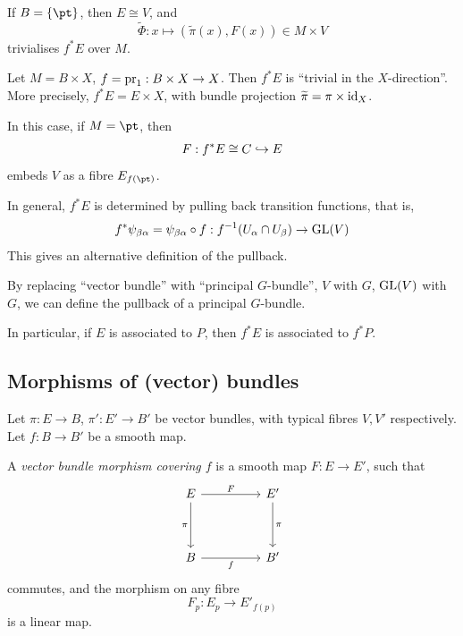 \documentclass{article}
\begin{document}
\begin{example}
    If \(B = \{\pt\}\), then \(E \cong V\), and
    \[\widetilde\Phi : x \mapsto (\tilde\pi(x), F(x)) \in M \times V\]
    trivialises \(f^*E\) over \(M\). 
\end{example}

\begin{example}
    Let \(M = B \times X\), \(f = \operatorname{pr}_1 : B \times X \to X\). Then \(f^*E\) is ``trivial in the \(X\)-direction''. More precisely, \(f^*E =  E \times X\), with bundle projection \(\widetilde\pi = \pi \times \operatorname{id}_X\).
\end{example}

\begin{example}
    In this case, if \(M = \pt\), then
    \[F : f^*E \cong C \hookrightarrow E\]
    embeds \(V\) as a fibre \(E_{f(\pt)}\).
\end{example}

In general, \(f^*E\) is determined by pulling back transition functions, that is,
\[f^*\psi_{\beta\alpha} = \psi_{\beta\alpha}\circ f : f^{-1}(U_\alpha \cap U_\beta) \to \operatorname{GL}(V)\]
This gives an alternative definition of the pullback.

By replacing ``vector bundle'' with ``principal \(G\)-bundle'', \(V\) with \(G\), \(\operatorname{GL}(V)\) with \(G\), we can define the pullback of a principal \(G\)-bundle.

In particular, if \(E\) is associated to \(P\), then \(f^*E\) is associated to \(f^*P\).

\lec

\subsection{Morphisms of (vector) bundles}

Let \(\pi : E \to B\), \(\pi' : E' \to B'\) be vector bundles, with typical fibres \(V, V'\) respectively. Let \(f : B \to B'\) be a smooth map.

\begin{definition}
     A \emph{vector bundle morphism covering \(f\)} is a smooth map \(F : E \to E'\), such that
\[\begin{tikzcd}
	E && {E'} \\
	\\
	B && {B'}
	\arrow["\pi"', from=1-1, to=3-1]
	\arrow["\pi", from=1-3, to=3-3]
	\arrow["F", from=1-1, to=1-3]
	\arrow["f"', from=3-1, to=3-3]
\end{tikzcd}\]
    commutes, and the morphism on any fibre
    \[F_p : E_p \to E'_{f(p)}\]
    is a linear map.
\end{definition}
\end{document}
